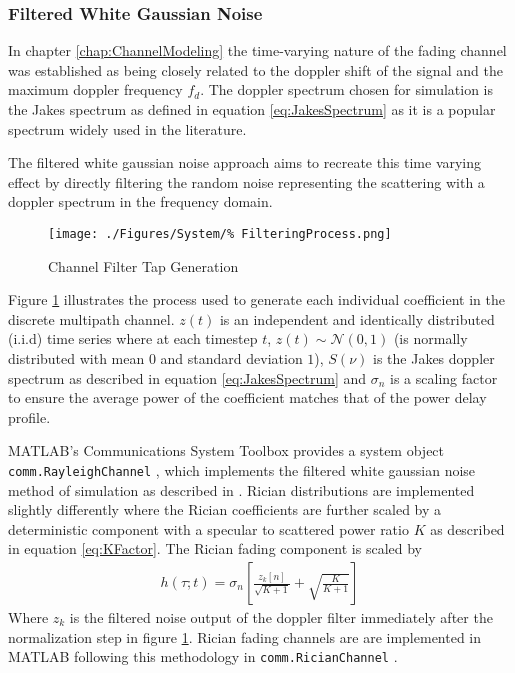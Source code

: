\subsubsection{Filtered White Gaussian Noise}

In chapter \ref{chap:ChannelModeling} the time-varying nature of %
the fading channel was established as being closely related to the %
doppler shift of the signal and the maximum doppler frequency $f_d$. %
The doppler spectrum chosen for simulation is the Jakes spectrum as %
defined in equation \ref{eq:JakesSpectrum} as it is a popular spectrum %
widely used in the literature. %

The filtered white gaussian noise approach aims to recreate this %
time varying effect by directly filtering the random noise representing %
the scattering with a doppler spectrum in the frequency domain\cite{%
MIMO-OFDM10, Iskander}. 
\begin{figure}[ht]
	\texttt{[image: ./Figures/System/\%
	FilteringProcess.png]}
	\caption{Channel Filter Tap Generation}
	\label{fig:ChannelFilterSimulation}
\end{figure}
Figure \ref{fig:ChannelFilterSimulation} illustrates the process %
used to generate each individual coefficient in the discrete %
multipath channel. $z(t)$ is an independent and identically %
distributed (i.i.d) time series where at each timestep $t$, %
$z(t)\sim\mathcal{N}(0,1)$ (is normally distributed %
with mean $0$ and standard deviation $1$), $S(\nu)$ is the %
Jakes doppler spectrum as described in equation %
\ref{eq:JakesSpectrum} and $\sigma_n$ is %
a scaling factor to ensure the average power of the coefficient %
matches that of the power delay profile.

MATLAB's Communications System Toolbox provides a system object %
\texttt{comm.RayleighChannel} \cite{RayleighChannel}, %
which implements the filtered %
white gaussian noise method of simulation as described in 
\cite{Iskander}. Rician distributions are implemented slightly %
differently where the Rician coefficients are further scaled by a %
deterministic component with a specular to %
scattered power ratio $K$ as described in equation %
\ref{eq:KFactor}. The Rician fading component is scaled by %
\begin{align}
	h(\tau;t) = \sigma_n\left[ \frac{z_{k}\left[n\right]}
	{\sqrt{K + 1}} + 
	\sqrt{\frac{K}{K+1}}\right]
\end{align}
Where $z_{k}$ is the filtered noise output of the doppler filter 
\cite{Iskander} immediately after the normalization step in figure %
\ref{fig:ChannelFilterSimulation}. Rician fading channels are %
are implemented in MATLAB following this methodology in %
\texttt{comm.RicianChannel} \cite{RicianChannel}.

